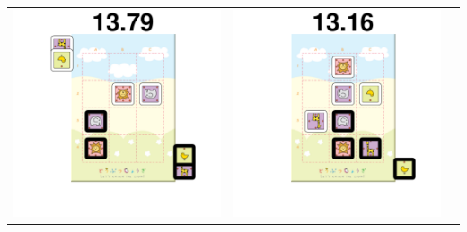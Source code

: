 \documentclass{beamer}
\begin{document}
\begin{frame}
\begin{tabular}{ccc}
\includegraphics[scale = 0.15]{val4.pdf} & 
\includegraphics[scale = 0.15]{val5.pdf} & 

\end{tabular}
\end{frame}
\end{document}

